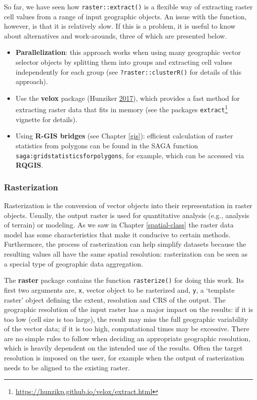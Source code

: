 \documentclass[]{krantz}
\providecommand{\tightlist}{%
  \setlength{\itemsep}{0pt}\setlength{\parskip}{0pt}}
\let\rmarkdownfootnote\footnote%
\def\footnote{\protect\rmarkdownfootnote}
\renewcommand{\href}[2]{#2\footnote{\url{#1}}}
\begin{document}
So far, we have seen how \texttt{raster::extract()} is a flexible way of extracting raster cell values from a range of input geographic objects.
An issue with the function, however, is that it is relatively slow.
If this is a problem, it is useful to know about alternatives and work-arounds, three of which are presented below.

\begin{itemize}
\tightlist
\item
  \textbf{Parallelization}: this approach works when using many geographic vector selector objects by splitting them into groups and extracting cell values independently for each group (see \texttt{?raster::clusterR()} for details of this approach).
\item
  Use the \textbf{velox} package (Hunziker \protect\hyperlink{ref-hunziker_velox:_2017}{2017}), which provides a fast method for extracting raster data that fits in memory (see the packages \href{https://hunzikp.github.io/velox/extract.html}{\texttt{extract}} vignette for details).
\item
  Using \textbf{R-GIS bridges} (see Chapter \ref{gis}): efficient calculation of raster statistics from polygons can be found in the SAGA function \texttt{saga:gridstatisticsforpolygons}, for example, which can be accessed via \textbf{RQGIS}.
\end{itemize}

\hypertarget{rasterization}{%
\subsubsection{Rasterization}\label{rasterization}}

Rasterization is the conversion of vector objects into their representation in raster objects.
Usually, the output raster is used for quantitative analysis (e.g., analysis of terrain) or modeling.
As we saw in Chapter \ref{spatial-class} the raster data model has some characteristics that make it conducive to certain methods.
Furthermore, the process of rasterization can help simplify datasets because the resulting values all have the same spatial resolution: rasterization can be seen as a special type of geographic data aggregation.

The \textbf{raster} package contains the function \texttt{rasterize()} for doing this work.
Its first two arguments are, \texttt{x}, vector object to be rasterized and, \texttt{y}, a `template raster' object defining the extent, resolution and CRS of the output.
The geographic resolution of the input raster has a major impact on the results: if it is too low (cell size is too large), the result may miss the full geographic variability of the vector data; if it is too high, computational times may be excessive.
There are no simple rules to follow when deciding an appropriate geographic resolution, which is heavily dependent on the intended use of the results.
Often the target resolution is imposed on the user, for example when the output of rasterization needs to be aligned to the existing raster.
\end{document}
